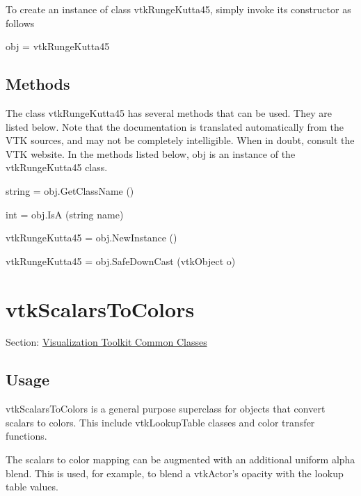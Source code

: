 To create an instance of class vtk\-Runge\-Kutta45, simply invoke its constructor as follows \begin{DoxyVerb}  obj = vtkRungeKutta45
\end{DoxyVerb}
 \hypertarget{vtkwidgets_vtkxyplotwidget_Methods}{}\subsection{Methods}\label{vtkwidgets_vtkxyplotwidget_Methods}
The class vtk\-Runge\-Kutta45 has several methods that can be used. They are listed below. Note that the documentation is translated automatically from the V\-T\-K sources, and may not be completely intelligible. When in doubt, consult the V\-T\-K website. In the methods listed below, {\ttfamily obj} is an instance of the vtk\-Runge\-Kutta45 class. 
\begin{DoxyItemize}
\item {\ttfamily string = obj.\-Get\-Class\-Name ()}  
\item {\ttfamily int = obj.\-Is\-A (string name)}  
\item {\ttfamily vtk\-Runge\-Kutta45 = obj.\-New\-Instance ()}  
\item {\ttfamily vtk\-Runge\-Kutta45 = obj.\-Safe\-Down\-Cast (vtk\-Object o)}  
\end{DoxyItemize}\hypertarget{vtkcommon_vtkscalarstocolors}{}\section{vtk\-Scalars\-To\-Colors}\label{vtkcommon_vtkscalarstocolors}
Section\-: \hyperlink{sec_vtkcommon}{Visualization Toolkit Common Classes} \hypertarget{vtkwidgets_vtkxyplotwidget_Usage}{}\subsection{Usage}\label{vtkwidgets_vtkxyplotwidget_Usage}
vtk\-Scalars\-To\-Colors is a general purpose superclass for objects that convert scalars to colors. This include vtk\-Lookup\-Table classes and color transfer functions.

The scalars to color mapping can be augmented with an additional uniform alpha blend. This is used, for example, to blend a vtk\-Actor's opacity with the lookup table values.

